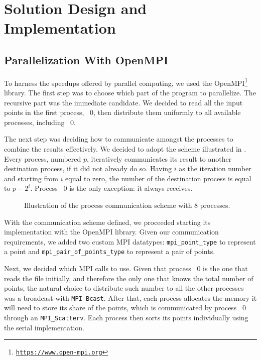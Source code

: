\section{Solution Design and Implementation}
\label{sec:parallelization}

\subsection{Parallelization With OpenMPI}
To harness the speedups offered by parallel computing, we used the OpenMPI\footnote{\texttt{\url{https://www.open-mpi.org}}} library.
The first step was to choose which part of the program to parallelize.
The recursive part was the immediate candidate.
We decided to read all the input points in the first process, \textnumero~0, then distribute them uniformly to all available processes, including \textnumero~0.

The next step was deciding how to communicate amongst the processes to combine the results effectively.
We decided to adopt the scheme illustrated in
.
Every process, numbered $p$, iteratively communicates its result to another destination process, if it did not already do so.
Having $i$ as the iteration number and starting from $i$ equal to zero, the number of the destination process is equal to $p-2^i$.
Process \textnumero~0 is the only exception: it always receives.

\begin{figure}[ht]
    \centering
    
    \caption{Illustration of the process communication scheme with 8 processes.}
    \label{fig:albero_bell_albero}
\end{figure}

With the communication scheme defined, we proceeded starting its implementation with the OpenMPI library.
Given our communication requirements, we added two custom MPI datatypes: \verb|mpi_point_type| to represent a point and \verb|mpi_pair_of_points_type|
to represent a pair of points.

Next, we decided which MPI calls to use.
Given that process \textnumero~0 is the one that reads the file initially, and therefore the only one that knows the total number of points, the natural choice to distribute such number to all the other processes was a broadcast with \verb|MPI_Bcast|.
After that, each process allocates the memory it will need to store its share of the points, which is communicated by process \textnumero~0 through an \verb|MPI_Scatterv|.
Each process then sorts its points individually using the serial implementation.

